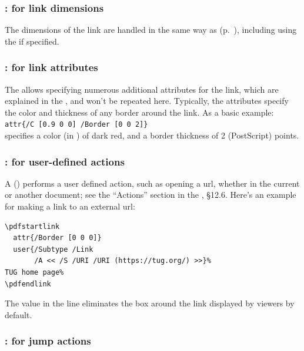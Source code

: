 \documentclass{pdftexmanual}
\begin{document}
\subsubsection{:  for link dimensions}

The dimensions of the link are handled in the same way as 
(p.~\pageref{pdfannot}), including using the  if
specified.

\subsubsection{:  for link attributes}

The  allows specifying numerous additional
attributes for the link, which are explained in the \PDFReference, and
won't be repeated here. Typically, the attributes specify the color and
thickness of any border around the link. As a basic example:\\
%
\verb|attr{/C [0.9 0 0] /Border [0 0 2]}|
%
\\specifies a color (in \RGB) of dark red, and a border thickness of 2
(PostScript) points.

\subsubsection{:  
               for user-defined actions}


A  () performs a user\hyph
defined action, such as opening a url, whether in the current or another
document; see the ``Actions'' section in the \PDFReference, \S12.6.
Here's an example for making a link to an external url:
\begin{verbatim}
\pdfstartlink
  attr{/Border [0 0 0]}
  user{/Subtype /Link
       /A << /S /URI /URI (https://tug.org/) >>}%
TUG home page%
\pdfendlink
\end{verbatim}

\noindent The  value in the  line eliminates
the box around the link displayed by viewers by default.

\subsubsection{:  
               for jump actions}
\end{document}

